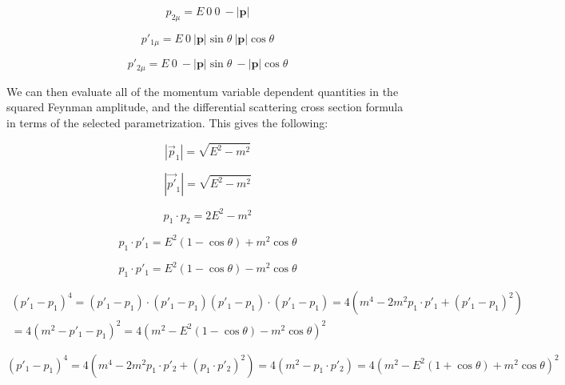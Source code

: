 \documentclass[a4]{article}
\begin{document}
    \begin{equation}
        p_{2 \mu} = E \: 0 \: 0 \: - |\mathbf{p}|
    \end{equation}

    \begin{equation}
        p'_{1 \mu} = E \: 0 \: |\mathbf{p}| \sin \theta \: |\mathbf{p}| \cos \theta
    \end{equation}

    \begin{equation}
        p'_{2 \mu} = E \: 0 \: - |\mathbf{p}| \sin \theta \: - |\mathbf{p}| \cos \theta
    \end{equation}

    We can then evaluate all of the momentum variable dependent quantities in the squared Feynman amplitude, and the differential scattering cross section formula in terms of the selected parametrization. This gives the following:

    \begin{equation}
        |\vec{p}_1| = \sqrt{E^2 - m^2}
    \end{equation}

    \begin{equation}
        |\vec{p'}_1| = \sqrt{E^2 - m^2}
    \end{equation}

    \begin{equation}
        p_1 \cdot p_2 = 2 E^2 - m^2
    \end{equation}

    \begin{equation}
        p_1 \cdot p'_1 = E^2 (1 - \cos \theta) + m^2 \cos \theta
    \end{equation}

    \begin{equation}
        p_1 \cdot p'_1 = E^2 (1 - \cos \theta) - m^2 \cos \theta
    \end{equation}

    \begin{eqnarray}
        (p'_1 - p_1)^4 = (p'_1 - p_1) \cdot (p'_1 - p_1) (p'_1 - p_1) \cdot (p'_1 - p_1) = 4 (m^4 - 2 m^2 p_1 \cdot p'_1 + (p'_1 - p_1)^2) \\
        = 4 (m^2 - p'_1 - p_1)^2 = 4 (m^2 - E^2 (1 - \cos \theta) - m^2 \cos \theta)^2
    \end{eqnarray}

    \begin{equation}
        (p'_1 - p_1)^4 = 4 (m^4 - 2 m^2 p_1 \cdot p'_2 + (p_1 \cdot p'_2)^2) = 4 (m^2 - p_1 \cdot p'_2) = 4 (m^2 - E^2 (1 + \cos \theta) + m^2 \cos \theta)^2
    \end{equation}
\end{document}
